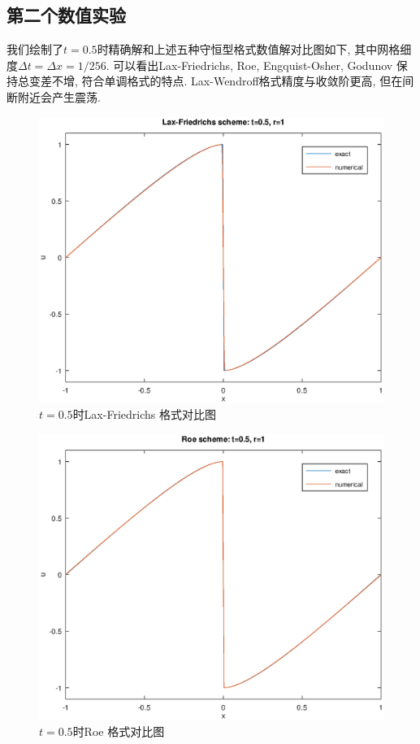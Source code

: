 \documentclass[a4paper, 12pt]{amsart}
\numberwithin{equation}{section}
\begin{document}
\hspace*{\fill}\par\subsection{第二个数值实验}\hspace*{\fill}\par\hspace*{\fill}\par
我们绘制了$t=0.5$时精确解和上述五种守恒型格式数值解对比图如下, 其中网格细度$\Delta t=\Delta x=1/256$. 可以看出Lax-Friedrichs, Roe, Engquist-Osher, Godunov 保持总变差不增, 符合单调格式的特点. Lax-Wendroff格式精度与收敛阶更高, 但在间断附近会产生震荡.
\begin{figure}[htbp]\centering
\includegraphics[width=\textwidth]{Lax-Friedrichs.eps}
\caption{$t=0.5$时Lax-Friedrichs 格式对比图}
\end{figure}

\begin{figure}[htbp]\centering
\includegraphics[width=\textwidth]{Roe.eps}
\caption{$t=0.5$时Roe 格式对比图}
\end{figure}
\end{document}
